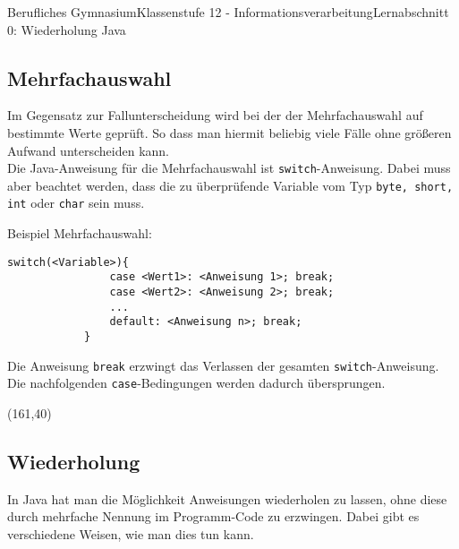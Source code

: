 \documentclass[11pt,oneside,openany,headings=optiontotoc,11pt,numbers=noenddot]{article}
\begin{document}
\begin{worksheet}{Berufliches Gymnasium}{Klassenstufe 12 - Informationsverarbeitung}{Lernabschnitt 0: Wiederholung Java}
		\subsection{Mehrfachauswahl}
		Im Gegensatz zur Fallunterscheidung wird bei der der Mehrfachauswahl auf bestimmte Werte geprüft. So dass man hiermit beliebig viele Fälle ohne größeren Aufwand unterscheiden kann.\\
		Die Java-Anweisung für die Mehrfachauswahl ist \lstinline[style=JavaInputStyle]|switch|-Anweisung. Dabei muss aber beachtet werden, dass die zu überprüfende Variable vom Typ \lstinline[style=JavaInputStyle]|byte, short, int| oder \lstinline[style=JavaInputStyle]|char| sein muss.\\
		\par\noindent
		Beispiel Mehrfachauswahl:
		\begin{lstlisting}[style=JavaInputStyle,frame=single]
			switch(<Variable>){
				case <Wert1>: <Anweisung 1>; break;
				case <Wert2>: <Anweisung 2>; break;
				...
				default: <Anweisung n>; break;
			}
		\end{lstlisting}
		Die Anweisung \lstinline[style=JavaInputStyle]|break| erzwingt das Verlassen der gesamten \lstinline[style=JavaInputStyle]|switch|-Anweisung. Die nachfolgenden \lstinline[style=JavaInputStyle]|case|-Bedingungen werden dadurch übersprungen.\\
		\begin{struktogramm}(161,40)
			\caseend

		\end{struktogramm}
		\subsection{Wiederholung}
		In Java hat man die Möglichkeit Anweisungen wiederholen zu lassen, ohne diese durch mehrfache Nennung im Programm-Code zu erzwingen. Dabei gibt es verschiedene Weisen, wie man dies tun kann.

\end{worksheet}
\end{document}
